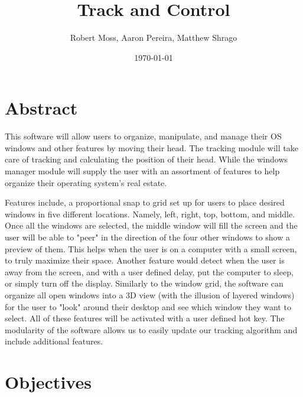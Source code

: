 \documentclass[12pt]{article}
\title{Track and Control}
\author{Robert Moss, Aaron Pereira, Matthew Shrago}
\date{\today}
\begin{document}
\maketitle

\section{Abstract}

This software will allow users to organize, manipulate, and manage their OS windows and other features by moving their head. The tracking module will take care of tracking and calculating the position of their head. While the windows manager module will supply the user with an assortment of features to help organize their operating system's real estate.

Features include, a proportional snap to grid set up for users to place desired windows in five different locations. Namely, left, right, top, bottom, and middle. Once all the windows are selected, the middle window will fill the screen and the user will be able to "peer" in the direction of the four other windows to show a preview of them. This helps when the user is on a computer with a small screen, to truly maximize their space. Another feature would detect when the user is away from the screen, and with a user defined delay, put the computer to sleep, or simply turn off the display. Similarly to the window grid, the software can organize all open windows into a 3D view (with the illusion of layered windows) for the user to "look" around their desktop and see which window they want to select. All of these features will be activated with a user defined hot key. The modularity of the software allows us to easily update our tracking algorithm and include additional features.


\section{Objectives}
\end{document}
